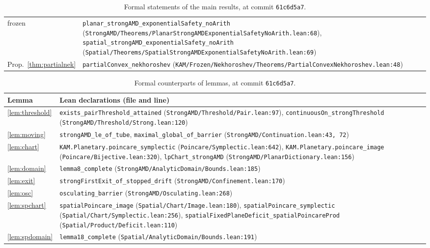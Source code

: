 \begin{table}[htb]
\begin{tabular}{@{}l>{\raggedright\arraybackslash}p{14cm}@{}}
\quad frozen & \texttt{planar\_strongAMD\_exponentialSafety\_noArith}
  (\texttt{StrongAMD/Theorems/PlanarStrongAMDExponentialSafetyNoArith.lean:68}),
  \texttt{spatial\_strongAMD\_exponentialSafety\_noArith}
  (\texttt{Spatial/Theorems/SpatialStrongAMDExponentialSafetyNoArith.lean:69})\\
Prop.~\ref{thm:partialnek} & \texttt{partialConvex\_nekhoroshev}
  (\texttt{KAM/Frozen/Nekhoroshev/Theorems/PartialConvexNekhoroshev.lean:48})\\
\bottomrule
\end{tabular}
\caption{Formal statements of the main results, at commit \texttt{61c6d5a7}.}\label{tab:lean-main}
\end{table}

\begin{table}[htb]
\centering\footnotesize
\begin{tabular}{@{}l>{\raggedright\arraybackslash}p{14.6cm}@{}}
\toprule
Lemma & Lean declarations (file and line)\\
\midrule
\ref{lem:threshold} & \texttt{exists\_pairThreshold\_attained} (\texttt{StrongAMD/Threshold/Pair.lean:97}),
  \texttt{continuousOn\_strongThreshold} (\texttt{StrongAMD/Threshold/Strong.lean:120})\\
\ref{lem:moving} & \texttt{strongAMD\_le\_of\_tube}, \texttt{maximal\_global\_of\_barrier}
  (\texttt{StrongAMD/Continuation.lean:43, 72})\\
\ref{lem:chart} & \texttt{KAM.Planetary.poincare\_symplectic} (\texttt{Poincare/Symplectic.lean:642}),
  \texttt{KAM.Planetary.poincare\_image} (\texttt{Poincare/Bijective.lean:320}),
  \texttt{lpChart\_strongAMD} (\texttt{StrongAMD/PlanarDictionary.lean:156})\\
\ref{lem:domain} & \texttt{lemma8\_complete} (\texttt{StrongAMD/AnalyticDomain/Bounds.lean:185})\\
\ref{lem:exit} & \texttt{strongFirstExit\_of\_stopped\_drift} (\texttt{StrongAMD/Confinement.lean:170})\\
\ref{lem:osc} & \texttt{osculating\_barrier} (\texttt{StrongAMD/Osculating.lean:268})\\
\ref{lem:spchart} & \texttt{spatialPoincare\_image} (\texttt{Spatial/Chart/Image.lean:180}),
  \texttt{spatialPoincare\_symplectic} (\texttt{Spatial/Chart/Symplectic.lean:256}),
  \texttt{spatialFixedPlaneDeficit\_spatialPoincareProd} (\texttt{Spatial/Product/Deficit.lean:110})\\
\ref{lem:spdomain} & \texttt{lemma18\_complete} (\texttt{Spatial/AnalyticDomain/Bounds.lean:191})\\
\bottomrule
\end{tabular}
\caption{Formal counterparts of lemmas, at commit \texttt{61c6d5a7}.}\label{tab:lean-lemmas}
\end{table}

